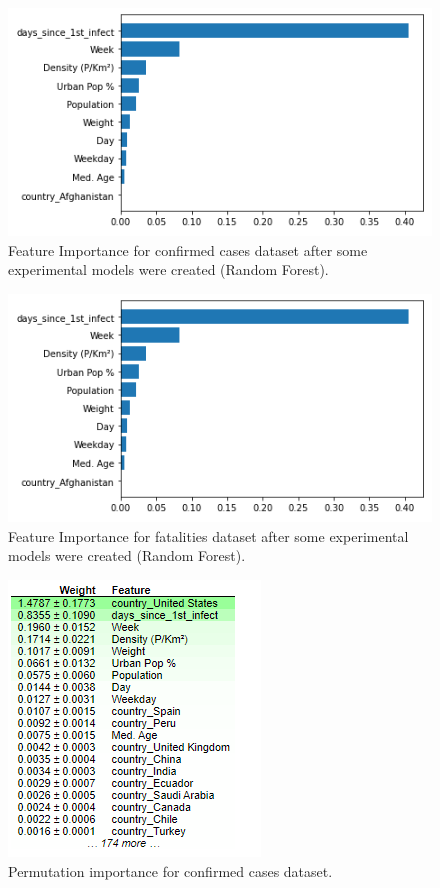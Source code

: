 \documentclass{article}
\begin{document}
\begin{figure}
  \centering
  \includegraphics[width=\columnwidth]{feature-imp-f-randfor.png}
  \caption{Feature Importance for confirmed cases dataset after some experimental models were created (Random Forest).}
\end{figure}

\begin{figure}
  \centering
  \includegraphics[width=\columnwidth]{feature-imp-f-randfor.png}
  \caption{Feature Importance for fatalities dataset after some experimental models were created (Random Forest).}
\end{figure}

\begin{figure}
    \centering
    \includegraphics{feature-permutation-importance-cc-data.png}
    \caption{Permutation importance for confirmed cases dataset.}
\end{figure}
\end{document}
